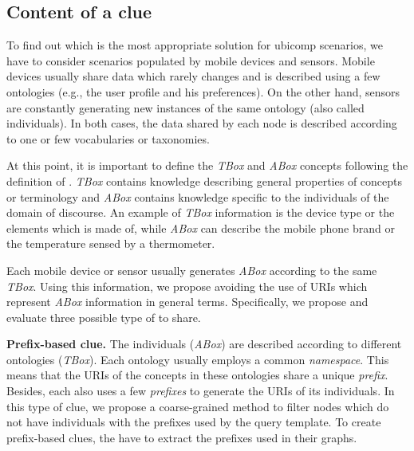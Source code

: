 \subsection{Content of a clue}
To find out which is the most appropriate solution for \ac{ubicomp} scenarios, we have to consider scenarios populated by mobile devices and sensors. %
Mobile devices usually share data which rarely changes and is described using a few ontologies (e.g., the user profile and his preferences).
On the other hand, sensors are constantly generating new instances of the same ontology (also called individuals).
In both cases, the data shared by each node is described according to one or few vocabularies or taxonomies.

At this point, it is important to define the \emph{TBox} and \emph{ABox} concepts following the definition of \citet{nardi2003introduction}.
\emph{TBox} contains knowledge describing general properties of concepts or terminology and
\emph{ABox} contains knowledge specific to the individuals of the domain of discourse.
An example of \emph{TBox} information is the device type or the elements which is made of,
while \emph{ABox} can describe the mobile phone brand or the temperature sensed by a thermometer.

Each mobile device or sensor usually generates \emph{ABox} according to the same \emph{TBox}.
Using this information, we propose avoiding the use of URIs which represent \emph{ABox} information in general terms.
Specifically, we propose and evaluate three possible type of \clues{} to share.

\medskip

\noindent\textbf{Prefix-based clue.}
The individuals (\emph{ABox}) are described according to different ontologies (\emph{TBox}).
Each ontology usually employs a common \emph{namespace}.
This means that the URIs of the concepts in these ontologies share a unique \emph{prefix}.
Besides, each \provider{} also uses a few \emph{prefixes} to generate the URIs of its individuals.
In this type of clue, we propose a coarse-grained method to filter nodes which do not have individuals with the prefixes used by the query template.
To create prefix-based clues, the \providers{} have to extract the prefixes used in their graphs. %

